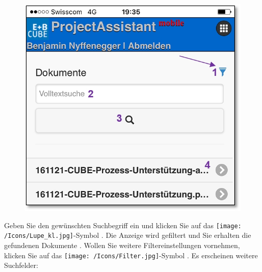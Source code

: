 \begin{figure}   %
  \vspace{-35pt}      %
  \begin{center}
    \includegraphics[width=1\linewidth]{../chapters/11_Dokumentenablage/pictures/11-mob04_Dokumentenuebersicht.jpg}
  \end{center}
  \vspace{-20pt}
  \vspace{-10pt}
\end{figure}

Geben Sie den gewünschten Suchbegriff  ein und klicken Sie auf das \texttt{[image: /Icons/Lupe\_kl.jpg]}-Symbol . Die Anzeige wird gefiltert und Sie erhalten die gefundenen Dokumente . Wollen Sie weitere Filtereinstellungen vornehmen, klicken Sie auf das \texttt{[image: /Icons/Filter.jpg]}-Symbol . Es erscheinen weitere Suchfelder:

\vspace{2.5cm}

